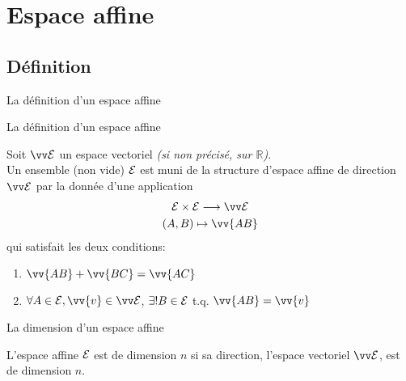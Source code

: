 \documentclass{m53beamer}
\begin{document}
\section{Espace affine}
\subsection{Définition}
\begin{frame}{La définition d'un espace affine}
  \begin{definition}[heuristique]
  \end{definition}
\end{frame}
\begin{frame}{La définition d'un espace affine}
  \begin{definition}
    Soit $\ev{E}$ un espace vectoriel \emph{(si non précisé, sur $\mathbb{R}$)}.\pause\\
    Un ensemble (non vide) $\mathcal{E}$ est muni de la structure d'\alert{espace affine de direction $\ev{E}$}
    par la donnée d'une application
    \begin{gather*}
      \ens{E} \times \ens{E} \longrightarrow \ev{E}\\
      (A,B) \mapsto \vv{AB}
    \end{gather*}\pause
    qui satisfait les deux conditions:
    \begin{enumerate}[<+(1)->]
      \item $\vv{AB}+\vv{BC}=\vv{AC}$ 
      \item $\forall A \in \ens{E}, \vv{v} \in \ev{E}$\pause , $\exists ! B \in \mathcal{E}$ t.q. $\vv{AB}=\vv{v}$
    \end{enumerate}
  \end{definition}
\end{frame}
\begin{frame}{La dimension d'un espace affine}
  \begin{definition}
    L'espace affine $\mathcal{E}$ est de dimension $n$ si sa direction, l'espace vectoriel $\ev{E}$, est de dimension $n$.
  \end{definition}
\end{frame}
\end{document}
